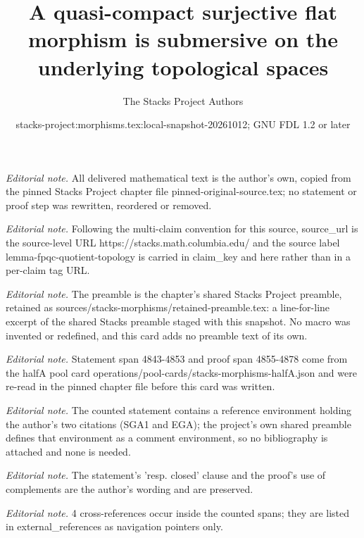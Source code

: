 \documentclass[10pt,a4paper]{amsart}
\title{A quasi-compact surjective flat morphism is submersive on the underlying topological spaces}
\author{The Stacks Project Authors}
\date{stacks-project:morphisms.tex:local-snapshot-20261012; GNU FDL 1.2 or later}
\theoremstyle{plain}
\theoremstyle{definition}
\theoremstyle{remark}
\numberwithin{equation}{subsection}
\begin{document}
\maketitle
\noindent\textit{Editorial note.} All delivered mathematical text is the author's own, copied from the pinned Stacks Project chapter file pinned-original-source.tex; no statement or proof step was rewritten, reordered or removed.\par\medskip
\noindent\textit{Editorial note.} Following the multi-claim convention for this source, source\_url is the source-level URL https://stacks.math.columbia.edu/ and the source label lemma-fpqc-quotient-topology is carried in claim\_key and here rather than in a per-claim tag URL.\par\medskip
\noindent\textit{Editorial note.} The preamble is the chapter's shared Stacks Project preamble, retained as sources/stacks-morphisms/retained-preamble.tex: a line-for-line excerpt of the shared Stacks preamble staged with this snapshot. No macro was invented or redefined, and this card adds no preamble text of its own.\par\medskip
\noindent\textit{Editorial note.} Statement span 4843-4853 and proof span 4855-4878 come from the halfA pool card operations/pool-cards/stacks-morphisms-halfA.json and were re-read in the pinned chapter file before this card was written.\par\medskip
\noindent\textit{Editorial note.} The counted statement contains a reference environment holding the author's two citations (SGA1 and EGA); the project's own shared preamble defines that environment as a comment environment, so no bibliography is attached and none is needed.\par\medskip
\noindent\textit{Editorial note.} The statement's 'resp. closed' clause and the proof's use of complements are the author's wording and are preserved.\par\medskip
\noindent\textit{Editorial note.} 4 cross-references occur inside the counted spans; they are listed in external\_references as navigation pointers only.\par\medskip
\end{document}

